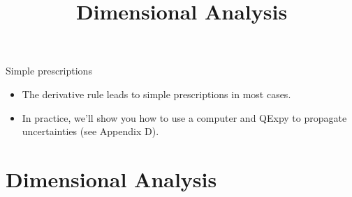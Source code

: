 \documentclass[aspectratio=169,
hyperref={colorlinks,urlcolor=blue}
]{beamer}
\begin{document}
\begin{frame}{Simple prescriptions}
\begin{itemize}
\item The derivative rule leads to simple prescriptions in most cases.
\item In practice, we’ll show you how to use a computer and QExpy to propagate uncertainties (see Appendix D).
\end{itemize}
\end{frame}









\section{Dimensional Analysis}
\label{sec:dimensionalanalysis}
\title{Dimensional Analysis}
\author{\insertsubsection}


\begin{frame}
\titlepage
\thispagestyle{empty}
\end{frame}







\end{document}
